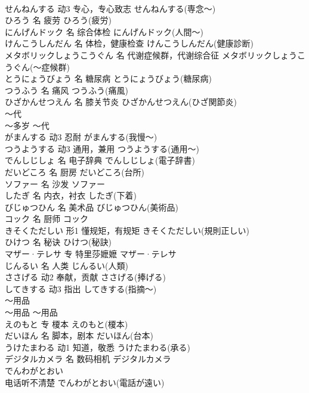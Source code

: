 \documentclass[8pt]{extreport}
\begin{document}
\begin{CJK}{UTF8}{min}
\\	せんねんする	动3	专心，专心致志	せんねんする(専念～)	
\\	ひろう	名	疲劳	ひろう(疲労)	
\\	にんげんドック	名	综合体检	にんげんドック(人間～)	
\\	けんこうしんだん	名	体检，健康检查	けんこうしんだん(健康診断)	
\\	メタボリックしょうこうぐん	名	代谢症候群，代谢综合征	メタボリックしょうこうぐん(～症候群)	
\\	とうにょうびょう	名	糖尿病	とうにょうびょう(糖尿病)	
\\	つうふう	名	痛风	つうふう(痛風)	
\\	ひざかんせつえん	名	膝关节炎	ひざかんせつえん(ひざ関節炎)	
\\	～代	
\\	～多岁	～代	
\\	がまんする	动3	忍耐	がまんする(我慢～)	
\\	つうようする	动3	通用，兼用	つうようする(通用～)	
\\	でんしじしょ	名	电子辞典	でんしじしょ(電子辞書)	
\\	だいどころ	名	厨房	だいどころ(台所)	
\\	ソファー	名	沙发	ソファー	
\\	したぎ	名	内衣，衬衣	したぎ(下着)	
\\	びじゅつひん	名	美术品	びじゅつひん(美術品)	
\\	コック	名	厨师	コック	
\\	きそくただしい	形1	懂规矩，有规矩	きそくただしい(規則正しい)	
\\	ひけつ	名	秘诀	ひけつ(秘訣)	
\\	マザー·テレサ	专	特里莎嬷嬷	マザー·テレサ	
\\	じんるい	名	人类	じんるい(人類)	
\\	ささげる	动2	奉献，贡献	ささげる(捧げる)	
\\	してきする	动3	指出	してきする(指摘～)	
\\	～用品	
\\	～用品	～用品	
\\	えのもと	专	榎本	えのもと(榎本)	
\\	だいほん	名	脚本，剧本	だいほん(台本)	
\\	うけたまわる	动1	知道，敬悉	うけたまわる(承る)	
\\	デジタルカメラ	名	数码相机	デジタルカメラ	
\\	でんわがとおい	
\\	电话听不清楚	でんわがとおい(電話が遠い)	

\end{CJK}
\end{document}
